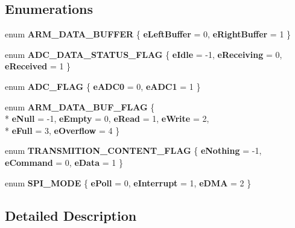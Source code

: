 \subsection*{Enumerations}
\begin{DoxyCompactItemize}
\item 
enum {\bfseries A\-R\-M\-\_\-\-D\-A\-T\-A\-\_\-\-B\-U\-F\-F\-E\-R} \{ {\bfseries e\-Left\-Buffer} = 0, 
{\bfseries e\-Right\-Buffer} = 1
 \}
\item 
enum {\bfseries A\-D\-C\-\_\-\-D\-A\-T\-A\-\_\-\-S\-T\-A\-T\-U\-S\-\_\-\-F\-L\-A\-G} \{ {\bfseries e\-Idle} = -\/1, 
{\bfseries e\-Receiving} = 0, 
{\bfseries e\-Received} = 1
 \}
\item 
enum {\bfseries A\-D\-C\-\_\-\-F\-L\-A\-G} \{ {\bfseries e\-A\-D\-C0} = 0, 
{\bfseries e\-A\-D\-C1} = 1
 \}
\item 
enum {\bfseries A\-R\-M\-\_\-\-D\-A\-T\-A\-\_\-\-B\-U\-F\-\_\-\-F\-L\-A\-G} \{ \\*
{\bfseries e\-Null} = -\/1, 
{\bfseries e\-Empty} = 0, 
{\bfseries e\-Read} = 1, 
{\bfseries e\-Write} = 2, 
\\*
{\bfseries e\-Full} = 3, 
{\bfseries e\-Overflow} = 4
 \}
\item 
enum {\bfseries T\-R\-A\-N\-S\-M\-I\-T\-I\-O\-N\-\_\-\-C\-O\-N\-T\-E\-N\-T\-\_\-\-F\-L\-A\-G} \{ {\bfseries e\-Nothing} = -\/1, 
{\bfseries e\-Command} = 0, 
{\bfseries e\-Data} = 1
 \}
\item 
enum {\bfseries S\-P\-I\-\_\-\-M\-O\-D\-E} \{ {\bfseries e\-Poll} = 0, 
{\bfseries e\-Interrupt} = 1, 
{\bfseries e\-D\-M\-A} = 2
 \}
\end{DoxyCompactItemize}


\subsection{Detailed Description}


